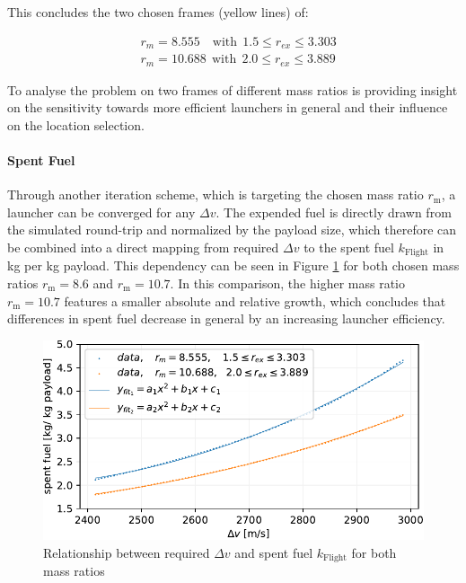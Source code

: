 \documentclass[utf8]{FrontiersinHarvard} %
\begin{document}
This concludes the two chosen frames (yellow lines) of:

\begin{equation*}
\begin{array}{ll}
     &  r_{m}=8.555 \quad \mathrm{with} \ \ 1.5 \leq r_{ex} \leq 3.303\\
     &  r_{m}=10.688  \ \ \mathrm{with} \ \ 2.0 \leq r_{ex} \leq 3.889
\end{array}
\label{eq:r_m_choice}
\end{equation*}

To analyse the problem on two frames of different mass ratios is providing insight on the sensitivity towards more efficient launchers in general and their influence on the location selection.





\newpage

\paragraph{Spent Fuel}
\label{sec:spent-fuel}

Through another iteration scheme, which is targeting the chosen mass ratio $r_{\mathrm{m}}$, a launcher can be converged for any $\Delta v$.
The expended fuel is directly drawn from the simulated round-trip and normalized by the payload size, which therefore can be combined into a direct mapping from required $\Delta v$ to the spent fuel $k_{\mathrm{Flight}}$ in kg per kg payload.
This dependency can be seen in Figure \ref{fig:fuel_cost_mapping} for both chosen mass ratios $r_{\mathrm{m}}=8.6$ and $r_{\mathrm{m}}=10.7$.
In this comparison, the higher mass ratio $r_{\mathrm{m}}=10.7$ features a smaller absolute and relative growth, which concludes that differences in spent fuel decrease in general by an increasing launcher efficiency.

\begin{figure}[h!]
\begin{center}
\includegraphics[width=\linewidth]{img/spent_total_mapping.pdf}
\end{center}
\caption{Relationship between required $\Delta v$ and spent fuel $k_{\mathrm{Flight}}$ for both mass ratios}
\label{fig:fuel_cost_mapping}
\end{figure}
\end{document}
